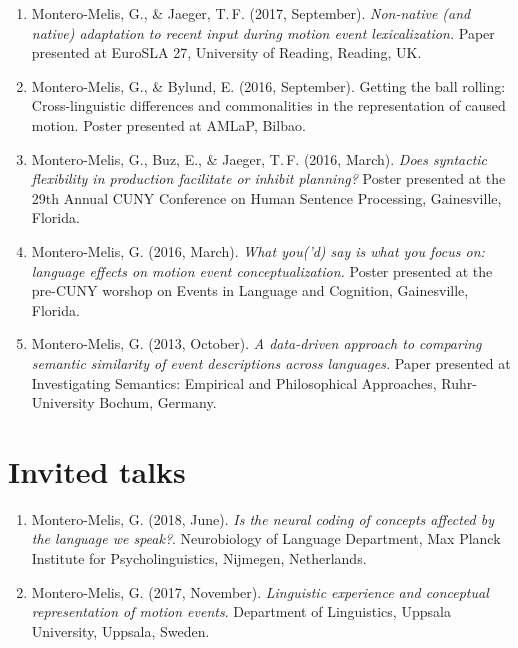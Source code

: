 \documentclass[margin, 11pt]{res} %
\begin{document}
\begin{resume}
\begin{enumerate}
\item Montero-Melis, G., \& Jaeger, T.\,F. (2017, September). \textit{Non-native (and native) adaptation to recent input during motion event lexicalization.} Paper presented at EuroSLA 27, University of Reading, Reading, UK.

\item Montero-Melis, G., \& Bylund, E. (2016, September). Getting the ball rolling: Cross-linguistic differences and commonalities in the representation of caused motion. Poster presented at AMLaP, Bilbao.

\item Montero-Melis, G., Buz, E., \& Jaeger, T.\,F. (2016, March). \textit{Does syntactic flexibility in production facilitate or inhibit planning?} Poster presented at the 29th Annual CUNY Conference on Human Sentence Processing, Gainesville, Florida.

\item Montero-Melis, G. (2016, March). \textit{What you('d) say is what you focus on: language effects on motion event conceptualization.} Poster presented at the pre-CUNY worshop on Events in Language and Cognition, Gainesville, Florida.

\item Montero-Melis, G. (2013, October). \textit{A data-driven approach to comparing semantic similarity of event descriptions across languages.} Paper presented at Investigating Semantics: Empirical and Philosophical Approaches, Ruhr-University Bochum, Germany.

\end{enumerate}



\section{\sc Invited talks}

\begin{enumerate}

\item Montero-Melis, G. (2018, June). \textit{Is the neural coding of concepts affected by the language we speak?}. Neurobiology of Language Department, Max Planck Institute for Psycholinguistics, Nijmegen, Netherlands.

\item Montero-Melis, G. (2017, November). \textit{Linguistic experience and conceptual representation of motion events}. Department of Linguistics, Uppsala University, Uppsala, Sweden.


\end{enumerate}
\end{resume}
\end{document}
